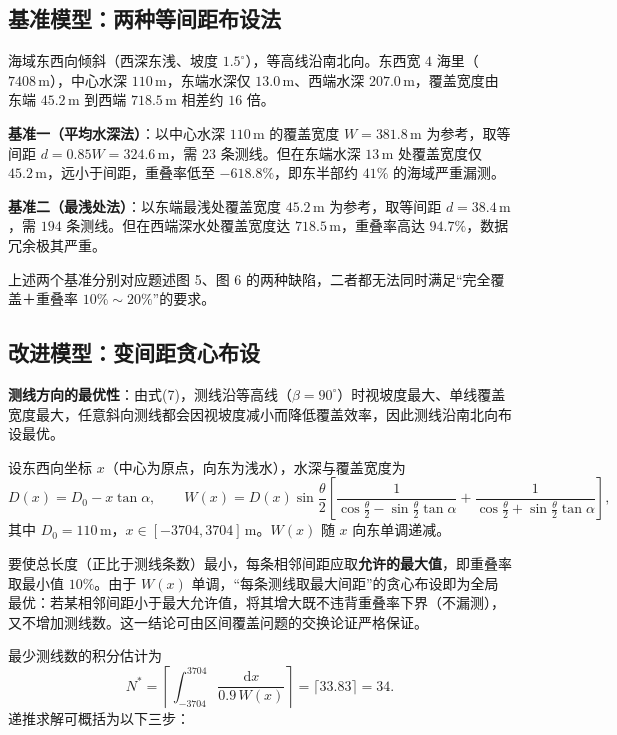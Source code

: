 \documentclass[12pt]{ctexart}
\begin{document}
\subsection{基准模型：两种等间距布设法}

海域东西向倾斜（西深东浅、坡度 $1.5^\circ$），等高线沿南北向。东西宽 $4$ 海里（$7408\,\mathrm{m}$），中心水深 $110\,\mathrm{m}$，东端水深仅 $13.0\,\mathrm{m}$、西端水深 $207.0\,\mathrm{m}$，覆盖宽度由东端 $45.2\,\mathrm{m}$ 到西端 $718.5\,\mathrm{m}$ 相差约 $16$ 倍。

\textbf{基准一（平均水深法）}：以中心水深 $110\,\mathrm{m}$ 的覆盖宽度 $W=381.8\,\mathrm{m}$ 为参考，取等间距 $d=0.85W=324.6\,\mathrm{m}$，需 $23$ 条测线。但在东端水深 $13\,\mathrm{m}$ 处覆盖宽度仅 $45.2\,\mathrm{m}$，远小于间距，重叠率低至 $-618.8\%$，即东半部约 $41\%$ 的海域严重漏测。

\textbf{基准二（最浅处法）}：以东端最浅处覆盖宽度 $45.2\,\mathrm{m}$ 为参考，取等间距 $d=38.4\,\mathrm{m}$，需 $194$ 条测线。但在西端深水处覆盖宽度达 $718.5\,\mathrm{m}$，重叠率高达 $94.7\%$，数据冗余极其严重。

上述两个基准分别对应题述图 5、图 6 的两种缺陷，二者都无法同时满足``完全覆盖＋重叠率 $10\%\sim20\%$''的要求。

\subsection{改进模型：变间距贪心布设}

\textbf{测线方向的最优性}：由式(7)，测线沿等高线（$\beta=90^\circ$）时视坡度最大、单线覆盖宽度最大，任意斜向测线都会因视坡度减小而降低覆盖效率，因此测线沿南北向布设最优。

设东西向坐标 $x$（中心为原点，向东为浅水），水深与覆盖宽度为
\begin{equation}
D(x)=D_0-x\tan\alpha,\qquad
W(x)=D(x)\sin\frac{\theta}{2}\left[\frac{1}{\cos\frac{\theta}{2}-\sin\frac{\theta}{2}\tan\alpha}+\frac{1}{\cos\frac{\theta}{2}+\sin\frac{\theta}{2}\tan\alpha}\right],
\end{equation}
其中 $D_0=110\,\mathrm{m}$，$x\in[-3704,3704]\,\mathrm{m}$。$W(x)$ 随 $x$ 向东单调递减。

要使总长度（正比于测线条数）最小，每条相邻间距应取\textbf{允许的最大值}，即重叠率取最小值 $10\%$。由于 $W(x)$ 单调，``每条测线取最大间距''的贪心布设即为全局最优：若某相邻间距小于最大允许值，将其增大既不违背重叠率下界（不漏测），又不增加测线数。这一结论可由区间覆盖问题的交换论证严格保证。

最少测线数的积分估计为
\begin{equation}
N^{*}=\left\lceil\int_{-3704}^{3704}\frac{\mathrm{d}x}{0.9\,W(x)}\right\rceil=\lceil 33.83\rceil=34.
\end{equation}
递推求解可概括为以下三步：
\end{document}
